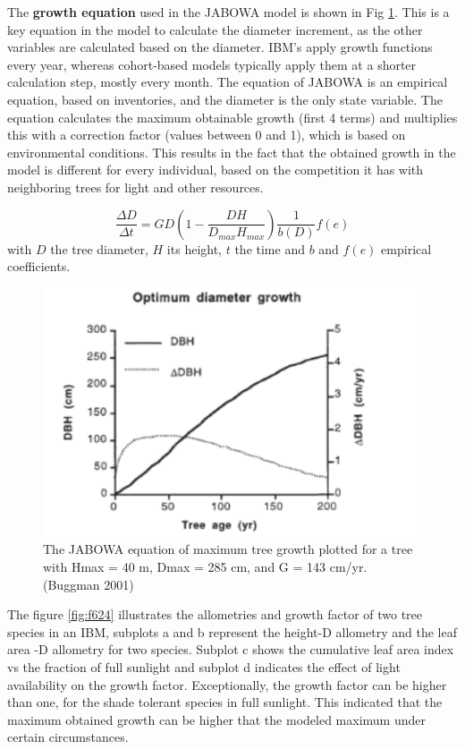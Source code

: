 \documentclass[12pt,oneside]{book}
\begin{document}
The \textbf{growth equation} used in the JABOWA model is shown in Fig
\ref{fig:f623}. This is a key equation in the model to calculate the
diameter increment, as the other variables are calculated based on the
diameter. IBM's apply growth functions every year, whereas cohort-based
models typically apply them at a shorter calculation step, mostly every
month. The equation of JABOWA is an empirical equation, based on
inventories, and the diameter is the only state variable. The equation
calculates the maximum obtainable growth (first 4 terms) and multiplies
this with a correction factor (values between 0 and 1), which is based
on environmental conditions. This results in the fact that the obtained
growth in the model is different for every individual, based on the
competition it has with neighboring trees for light and other resources.

\[
\frac{\Delta D}{\Delta t}=GD(1-\frac{DH}{D_{max}H_{max}})\frac{1}{b(D)}f(e)
\] with \(D\) the tree diameter, \(H\) its height, \(t\) the time and
\(b\) and \(f(e)\) empirical coefficients.

\begin{figure}

{\centering \includegraphics[width=0.8\linewidth]{figures/chap6/f623_jabowa_growth} 

}

\caption{The JABOWA equation of maximum tree growth plotted for a tree with Hmax = 40 m, Dmax = 285 cm, and G = 143 cm/yr. (Buggman 2001)}\label{fig:f623}
\end{figure}

The figure \ref{fig:f624} illustrates the allometries and growth factor
of two tree species in an IBM, subplots a and b represent the height-D
allometry and the leaf area -D allometry for two species. Subplot c
shows the cumulative leaf area index vs the fraction of full sunlight
and subplot d indicates the effect of light availability on the growth
factor. Exceptionally, the growth factor can be higher than one, for the
shade tolerant species in full sunlight. This indicated that the maximum
obtained growth can be higher that the modeled maximum under certain
circumstances.
\end{document}
